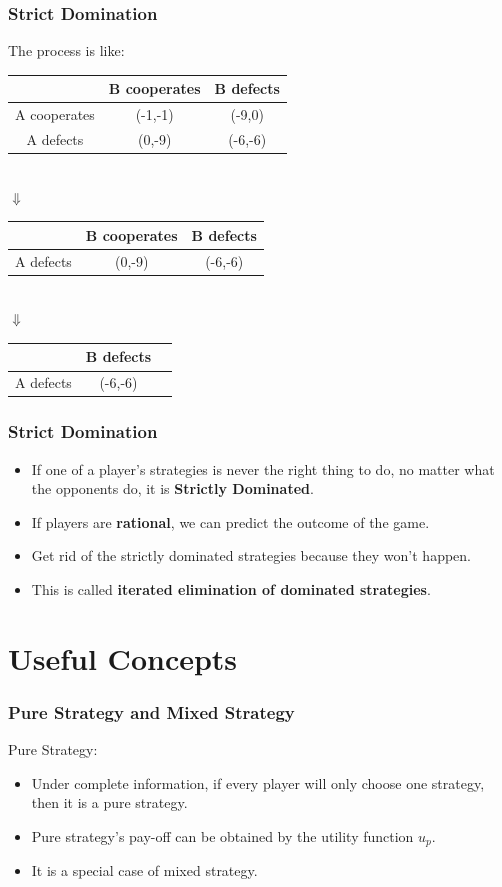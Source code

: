 \documentclass{beamer}
\begin{document}
\begin{frame}
\frametitle{Strict Domination}
The process is like:\\
\centering
\begin{tabular}{|c|c|c|}
\hline
\hline
    & B cooperates & B defects\\
\hline
A cooperates & (-1,-1) & (-9,0)\\
\hline
A defects & (0,-9) & (-6,-6)\\
\hline
\hline
\end{tabular}\\
$\Downarrow$\\
\begin{tabular}{|c|c|c|}
\hline
\hline
    & B cooperates & B defects\\
\hline
A defects & (0,-9) & (-6,-6)\\
\hline
\hline
\end{tabular}\\
$\Downarrow$\\
\begin{tabular}{|c|c|c|}
\hline
\hline
     & B defects\\
\hline
A defects & (-6,-6)\\
\hline
\hline
\end{tabular}
\end{frame}

\begin{frame}
\frametitle{Strict Domination}
\begin{itemize}
\item
If one of a player’s strategies is never the right thing to do, no matter what the opponents do, it is \textbf{Strictly Dominated}.
\item
If players are \textbf{rational}, we can predict the outcome of the game.
\item
Get rid of the strictly dominated strategies because they won't happen.
\item
This is called \textbf{iterated elimination of dominated strategies}.
\end{itemize}
\end{frame}


\section{Useful Concepts}

\begin{frame}
\frametitle{Pure Strategy and Mixed Strategy}
Pure Strategy:\\
\begin{itemize}
\item Under complete information, if every player will {\color{red} only choose one strategy}, then it is a pure strategy.
\item Pure strategy's pay-off {\color{red}can be obtained} by the utility function $u_p$.
\item It is a special case of mixed strategy.
\end{itemize}
\end{frame}
\end{document}
